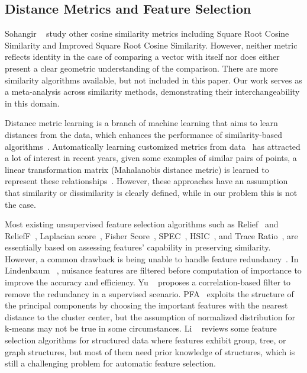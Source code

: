 \subsection{Distance Metrics and Feature Selection}
Sohangir \etal~\cite{sohangir2017improved} study other cosine similarity metrics including Square Root Cosine Similarity and Improved Square Root Cosine Similarity. However, neither metric reflects identity in the case of comparing a vector with itself nor does either present a clear geometric understanding of the comparison. There are more similarity algorithms available, but not included in this paper. Our work serves as a meta-analysis across similarity methods, demonstrating their interchangeability in this domain. 

Distance metric learning is a branch of machine learning that aims to learn distances from
the data, which enhances the performance of similarity-based algorithms~\cite{suarez2021tutorial}. Automatically learning customized metrics from data~\cite{bellet2013survey} has attracted a lot of interest in recent years, \eg given some examples of similar pairs of points, a linear transformation matrix (Mahalanobis distance metric) is learned to represent these relationships~\cite{xing2002distance,weinberger2009distance}. However, these approaches have an assumption that similarity or dissimilarity is clearly defined, while in our problem this is not the case.


Most existing unsupervised feature selection algorithms such as Relief~\cite{kira1992practical} and ReliefF~\cite{kononenko1997overcoming}, Laplacian score~\cite{he2005laplacian}, Fisher Score~\cite{jennrich1976newton}, SPEC~\cite{nguyen2014effective}, HSIC~\cite{yamada2012high}, and Trace Ratio~\cite{nie2008trace}, are essentially based on assessing features' capability in preserving similarity. However, a common drawback is being unable to handle feature redundancy~\cite{zhao2011similarity}. In Lindenbaum \etal~\cite{lindenbaum2021differentiable}, nuisance features are filtered before computation of importance to improve the accuracy and efficiency. Yu \etal~\cite{yu2003feature} proposes a correlation-based filter to remove the redundancy in a supervised scenario.
PFA~\cite{lu2007feature} exploits the structure of the principal components by choosing the important features with the nearest distance to the cluster center, but the assumption of normalized distribution for k-means may not be true in some circumstances. Li \etal~\cite{li2018feature} reviews some feature selection algorithms for structured data where features exhibit group, tree, or graph structures, but most of them need prior knowledge of structures, which is still a challenging problem for automatic feature selection.

